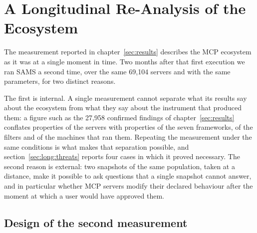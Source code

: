 %

\chapter{A Longitudinal Re-Analysis of the Ecosystem}
\label{ch:longitudinal}

The measurement reported in chapter~\ref{sec:results} describes the MCP
ecosystem as it was at a single moment in time. Two months after that first
execution we ran SAMS a second time, over the same 69,104 servers and with the
same parameters, for two distinct reasons.

The first is internal. A single measurement cannot separate what its results say
about the ecosystem from what they say about the instrument that produced them:
a figure such as the 27,958 confirmed findings of chapter~\ref{sec:results}
conflates properties of the servers with properties of the seven frameworks, of
the filters and of the machines that ran them. Repeating the measurement under
the same conditions is what makes that separation possible, and
section~\ref{sec:long:threats} reports four cases in which it proved necessary.
The second reason is external: two snapshots of the same population, taken at a
distance, make it possible to ask questions that a single snapshot cannot
answer, and in particular whether MCP servers modify their declared behaviour
after the moment at which a user would have approved them.

\section{Design of the second measurement}
\label{sec:long:design}

